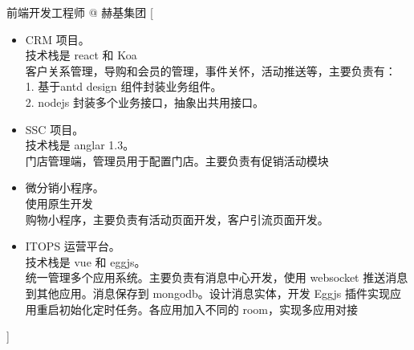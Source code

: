 \documentclass[zh]{resume}
\begin{document}
\begin{experiences}
    {前端开发工程师 @ 赫基集团}%
    [\begin{itemize}
      \item CRM 项目。\\ 技术栈是 react 和 Koa \\ 客户关系管理，导购和会员的管理，事件关怀，活动推送等，主要负责有：\\ 1. 基于antd design 组件封装业务组件。\\ 2. nodejs 封装多个业务接口，抽象出共用接口。
      \item SSC 项目。\\ 技术栈是 anglar 1.3。\\ 门店管理端，管理员用于配置门店。主要负责有促销活动模块
      \item 微分销小程序。\\ 使用原生开发 \\ 购物小程序，主要负责有活动页面开发，客户引流页面开发。
      \item ITOPS 运营平台。\\ 技术栈是 vue 和 eggjs。\\ 统一管理多个应用系统。主要负责有消息中心开发，使用 websocket 推送消息到其他应用。消息保存到 mongodb。设计消息实体，开发 Eggjs 插件实现应用重启初始化定时任务。各应用加入不同的 room，实现多应用对接
    \end{itemize}]

\end{experiences}
\end{document}
